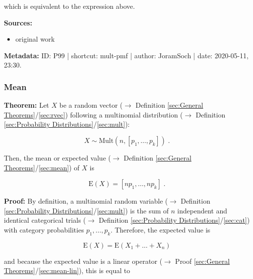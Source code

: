 \documentclass[a4paper,12pt,twoside]{book}
\begin{document}
which is equivalent to the expression above.


\vspace{1em}
\textbf{Sources:}
\begin{itemize}
\item original work\end{itemize}


\vspace{1em}
\textbf{Metadata:} ID: P99 | shortcut: mult-pmf | author: JoramSoch | date: 2020-05-11, 23:30.
\vspace{1em}



\subsubsection[\textbf{Mean}]{Mean} \label{sec:mult-mean}
\setcounter{equation}{0}

\textbf{Theorem:} Let $X$ be a random vector ($\rightarrow$ Definition \ref{sec:General Theorems}/\ref{sec:rvec}) following a multinomial distribution ($\rightarrow$ Definition \ref{sec:Probability Distributions}/\ref{sec:mult}):

\begin{equation} \label{eq:mult-mean-mult}
X \sim \mathrm{Mult}(n,\left[p_1, \ldots, p_k \right]) \; .
\end{equation}

Then, the mean or expected value ($\rightarrow$ Definition \ref{sec:General Theorems}/\ref{sec:mean}) of $X$ is

\begin{equation} \label{eq:mult-mean-bin-mean}
\mathrm{E}(X) = \left[n p_1, \ldots, n p_k \right] \; .
\end{equation}


\vspace{1em}
\textbf{Proof:} By definition, a multinomial random variable ($\rightarrow$ Definition \ref{sec:Probability Distributions}/\ref{sec:mult}) is the sum of $n$ independent and identical categorical trials ($\rightarrow$ Definition \ref{sec:Probability Distributions}/\ref{sec:cat}) with category probabilities $p_1, \ldots, p_k$. Therefore, the expected value is

\begin{equation} \label{eq:mult-mean-mult-mean-s1}
\mathrm{E}(X) = \mathrm{E}(X_1 + \ldots + X_n)
\end{equation}

and because the expected value is a linear operator ($\rightarrow$ Proof \ref{sec:General Theorems}/\ref{sec:mean-lin}), this is equal to
\end{document}
